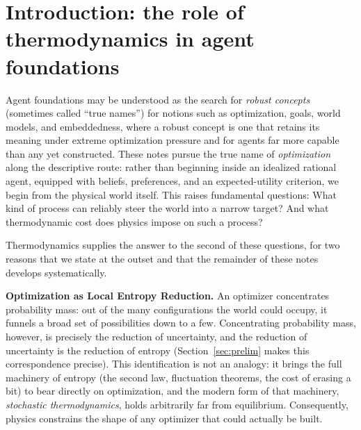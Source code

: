 \documentclass[11pt]{article}
\begin{document}
\begin{abstract}
establish that agents with greater knowledge of the world possess correspondingly greater capacity to act upon it, with the exchange rate between the two set by thermodynamics.
\end{abstract}

\tableofcontents

\section{Introduction: the role of thermodynamics in agent foundations}
\label{sec:intro}

Agent foundations may be understood as the search for \emph{robust concepts} (sometimes called ``true names'') for notions such as optimization, goals, world models, and embeddedness, where a robust concept is one that retains its meaning under extreme optimization pressure and for agents far more capable than any yet constructed. These notes pursue the true name of \emph{optimization} along the descriptive route: rather than beginning inside an idealized rational agent, equipped with beliefs, preferences, and an expected-utility criterion, we begin from the physical world itself. This raises fundamental questions: What kind of process can reliably steer the world into a narrow target? And what thermodynamic cost does physics impose on such a process?

Thermodynamics supplies the answer to the second of these questions, for two reasons that we state at the outset and that the remainder of these notes develops systematically.

\textbf{Optimization as Local Entropy Reduction.} An optimizer concentrates probability mass: out of the many configurations the world could occupy, it funnels a broad set of possibilities down to a few. Concentrating probability mass, however, is precisely the reduction of uncertainty, and the reduction of uncertainty is the reduction of entropy (Section~\ref{sec:prelim} makes this correspondence precise). This identification is not an analogy: it brings the full machinery of entropy (the second law, fluctuation theorems, the cost of erasing a bit) to bear directly on optimization, and the modern form of that machinery, \emph{stochastic thermodynamics}, holds arbitrarily far from equilibrium. Consequently, physics constrains the shape of any optimizer that could actually be built.
\end{document}
